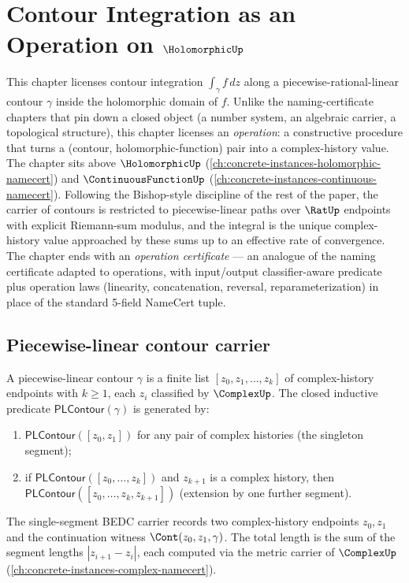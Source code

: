 \chapter{Contour Integration as an Operation on \(\HolomorphicUp\)}
\label{ch:concrete-instances-contour-integral}

This chapter licenses contour integration \(\int_\gamma f \, dz\) along a piecewise-rational-linear contour \(\gamma\) inside the holomorphic domain of \(f\). Unlike the naming-certificate chapters that pin down a closed object (a number system, an algebraic carrier, a topological structure), this chapter licenses an \emph{operation}: a constructive procedure that turns a (contour, holomorphic-function) pair into a complex-history value. The chapter sits above \(\HolomorphicUp\) (\autoref{ch:concrete-instances-holomorphic-namecert}) and \(\ContinuousFunctionUp\) (\autoref{ch:concrete-instances-continuous-namecert}). Following the Bishop-style discipline of the rest of the paper, the carrier of contours is restricted to piecewise-linear paths over \(\RatUp\) endpoints with explicit Riemann-sum modulus, and the integral is the unique complex-history value approached by these sums up to an effective rate of convergence. The chapter ends with an \emph{operation certificate} --- an analogue of the naming certificate adapted to operations, with input/output classifier-aware predicate plus operation laws (linearity, concatenation, reversal, reparameterization) in place of the standard 5-field NameCert tuple.

\section{Piecewise-linear contour carrier}

\begin{definition}
\label{def:pl-contour}
A piecewise-linear contour \(\gamma\) is a finite list \([z_0, z_1, \ldots, z_k]\) of complex-history endpoints with \(k \geq 1\), each \(z_i\) classified by \(\ComplexUp\). The closed inductive predicate \(\mathsf{PLContour}(\gamma)\) is generated by:
\begin{enumerate}
  \item \(\mathsf{PLContour}([z_0, z_1])\) for any pair of complex histories (the singleton segment);
  \item if \(\mathsf{PLContour}([z_0, \ldots, z_k])\) and \(z_{k+1}\) is a complex history, then \(\mathsf{PLContour}([z_0, \ldots, z_k, z_{k+1}])\) (extension by one further segment).
\end{enumerate}
The single-segment BEDC carrier records two complex-history endpoints \(z_0,z_1\) and the continuation witness \(\Cont(z_0,z_1,\gamma)\). The total length is the sum of the segment lengths \(|z_{i+1} - z_i|\), each computed via the metric carrier of \(\ComplexUp\) (\autoref{ch:concrete-instances-complex-namecert}).
\end{definition}

